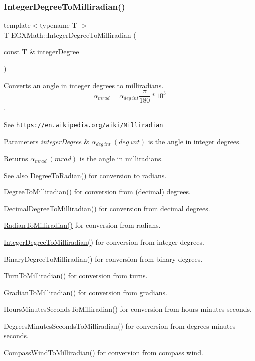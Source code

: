 \subsubsection{\texorpdfstring{Integer\+Degree\+To\+Milliradian()}{IntegerDegreeToMilliradian()}}
{\footnotesize\ttfamily template$<$typename T $>$ \\
T E\+G\+X\+Math\+::\+Integer\+Degree\+To\+Milliradian (\begin{DoxyParamCaption}\item[{const T \&}]{integer\+Degree }\end{DoxyParamCaption})}



Converts an angle in integer degrees to milliradians. \[\alpha_{mrad}=\alpha_{deg\ int}\frac{\pi}{180}*10^3\]. 

See \href{https://en.wikipedia.org/wiki/Milliradian}{\tt https\+://en.\+wikipedia.\+org/wiki/\+Milliradian} 
\begin{DoxyParams}{Parameters}
{\em integer\+Degree} & $\alpha_{deg\ int}\ (deg\ int)$ is the angle in integer degrees. \\
\hline
\end{DoxyParams}
\begin{DoxyReturn}{Returns}
$\alpha_{mrad}\ (mrad)$ is the angle in milliradians. 
\end{DoxyReturn}
\begin{DoxySeeAlso}{See also}
\mbox{\hyperlink{group___e_g_x_math-_angle_conversions-_degree_ga48585541b228c852c9d08a9eac3682f0}{Degree\+To\+Radian()}} for conversion to radians. 

\mbox{\hyperlink{group___e_g_x_math-_angle_conversions-_degree_gae4fa6c2d3805430760783650cfbfdb11}{Degree\+To\+Milliradian()}} for conversion from (decimal) degrees. 

\mbox{\hyperlink{group___e_g_x_math-_angle_conversions-_decimal_degree_gab567d02d4692d9642a4ad219e479713a}{Decimal\+Degree\+To\+Milliradian()}} for conversion from decimal degrees. 

\mbox{\hyperlink{group___e_g_x_math-_angle_conversions-_radian_gaea391f0cca39b05e298dd1cae162e7f1}{Radian\+To\+Milliradian()}} for conversion from radians. 

\mbox{\hyperlink{group___e_g_x_math-_angle_conversions-_integer_degree_ga5379a68bdff5cc4fab5bb1ba06ef9453}{Integer\+Degree\+To\+Milliradian()}} for conversion from integer degrees. 

Binary\+Degree\+To\+Milliradian() for conversion from binary degrees. 

Turn\+To\+Milliradian() for conversion from turns. 

Gradian\+To\+Milliradian() for conversion from gradians. 

Hours\+Minutes\+Seconds\+To\+Milliradian() for conversion from hours minutes seconds. 

Degrees\+Minutes\+Seconds\+To\+Milliradian() for conversion from degrees minutes seconds. 

Compass\+Wind\+To\+Milliradian() for conversion from compass wind. 
\end{DoxySeeAlso}
